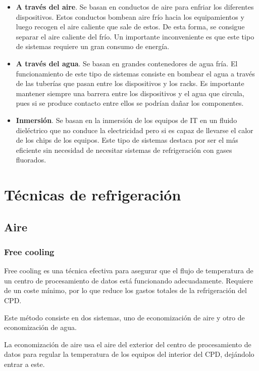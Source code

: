 \begin{itemize}
    \item \textbf{A través del aire}. Se basan en conductos de aire para enfriar los diferentes dispositivos. Estos conductos bombean aire frío hacia los equipamientos y luego recogen el aire caliente que sale de estos. De esta forma, se consigue separar el aire caliente del frío. Un importante inconveniente es que este tipo de sistemas requiere un gran consumo de energía.
    \item \textbf{A través del agua}. Se basan en grandes contenedores de agua fría. El funcionamiento de este tipo de sistemas consiste en bombear el agua a través de las tuberías que pasan entre los dispositivos y los racks. Es importante mantener siempre una barrera entre los dispositivos y el agua que circula, pues si se produce contacto entre ellos se podrían dañar los componentes.
    \item \textbf{Inmersión}. Se basan en la inmersión de los equipos de IT en un fluido dieléctrico que no conduce la electricidad pero si es capaz de llevarse el calor de los chips de los equipos. Este tipo de sistemas destaca por ser el más eficiente sin necesidad de necesitar sistemas de refrigeración con gases fluorados.
\end{itemize}

\section*{Técnicas de refrigeración}

\subsection*{Aire}
\subsubsection*{Free cooling}

Free cooling es una técnica efectiva para asegurar que el flujo de temperatura de un centro de procesamiento de datos está funcionando adecuadamente. Requiere de un coste mínimo, por lo que reduce los gastos totales de la refrigeración del CPD.

Este método consiste en dos sistemas, uno de economización de aire y otro de economización de agua.

La economización de aire usa el aire del exterior del centro de procesamiento de datos para regular la temperatura de los equipos del interior del CPD, dejándolo entrar a este.

